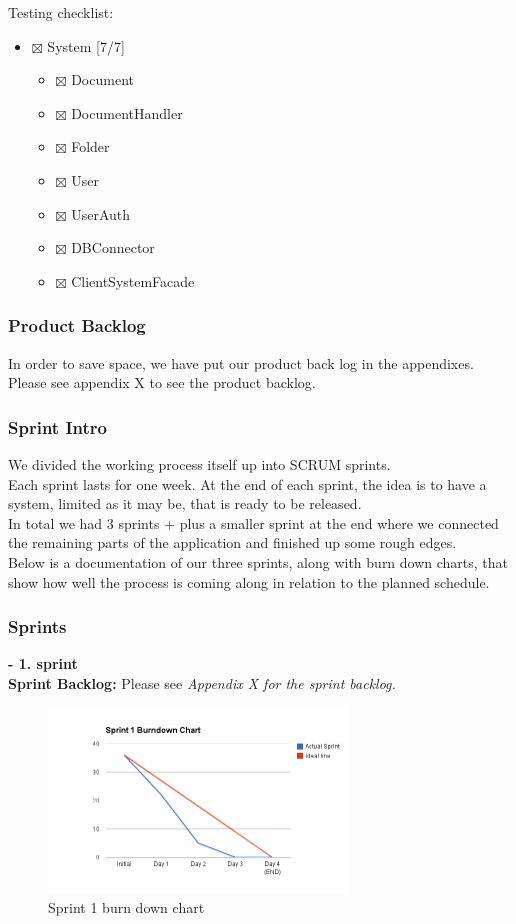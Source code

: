 \documentclass[11pt]{article}
\begin{document}
Testing checklist:
\begin{itemize}
\item $\boxtimes$ System [7/7]
\begin{itemize}
\item $\boxtimes$ Document
\item $\boxtimes$ DocumentHandler
\item $\boxtimes$ Folder
\item $\boxtimes$ User
\item $\boxtimes$ UserAuth
\item $\boxtimes$ DBConnector
\item $\boxtimes$ ClientSystemFacade
\end{itemize}
\end{itemize}

\subsubsection{Product Backlog}
\label{sec-5-1-2}
In order to save space, we have put our product back log in the appendixes. Please see appendix X to see the product backlog.
\subsubsection{Sprint Intro}
\label{sec-5-1-3}
We divided the working process itself up into SCRUM sprints. \\
Each sprint lasts for one week. At the end of  each sprint, the idea is to have a system, limited as it may be, that is ready to be released. \\
In total we had 3 sprints + plus a smaller sprint at the end where we connected the remaining parts of the application and finished up some rough edges. \\
Below is a documentation of our three sprints, along with burn down charts, that show how well the process is coming along in relation to the planned schedule.
\subsubsection{Sprints}
\label{sec-5-1-4}

\textbf{- 1. sprint} \\
\textbf{Sprint Backlog:} Please see \emph{Appendix X for the sprint backlog.}

\begin{figure}[H]
  		\centering
    	\includegraphics[width=300px]{images/SCRUM/Sprint 1 burndown chart.png}
    	\caption{Sprint 1 burn down chart}
\end{figure}
\end{document}
